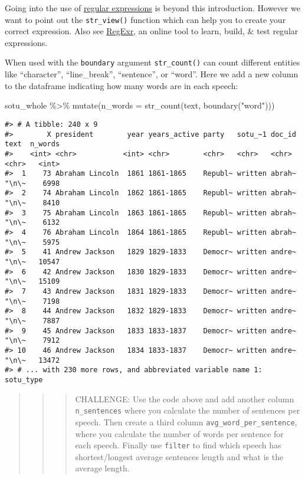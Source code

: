 \documentclass[
]{book}
\newenvironment{Shaded}{\begin{snugshade}}{\end{snugshade}}
\newcommand{\AttributeTok}[1]{\textcolor[rgb]{0.77,0.63,0.00}{#1}}
\newcommand{\FunctionTok}[1]{\textcolor[rgb]{0.00,0.00,0.00}{#1}}
\newcommand{\NormalTok}[1]{#1}
\newcommand{\SpecialCharTok}[1]{\textcolor[rgb]{0.00,0.00,0.00}{#1}}
\newcommand{\StringTok}[1]{\textcolor[rgb]{0.31,0.60,0.02}{#1}}
\begin{document}
Going into the use of \href{https://en.wikipedia.org/wiki/Regular_expression}{regular expressions} is beyond this introduction. However we want to point out the \texttt{str\_view()} function which can help you to create your correct expression. Also see \href{https://regexr.com/}{RegExr}, an online tool to learn, build, \& test regular expressions.

When used with the \texttt{boundary} argument \texttt{str\_count()} can count different entities like ``character'', ``line\_break'', ``sentence'', or ``word''. Here we add a new column to the dataframe indicating how many words are in each speech:

\begin{Shaded}
\begin{Highlighting}[]
\NormalTok{sotu\_whole }\SpecialCharTok{\%\textgreater{}\%} 
  \FunctionTok{mutate}\NormalTok{(}\AttributeTok{n\_words =} \FunctionTok{str\_count}\NormalTok{(text, }\FunctionTok{boundary}\NormalTok{(}\StringTok{"word"}\NormalTok{))) }
\end{Highlighting}
\end{Shaded}

\begin{verbatim}
#> # A tibble: 240 x 9
#>        X president        year years_active party   sotu_~1 doc_id text  n_words
#>    <int> <chr>           <int> <chr>        <chr>   <chr>   <chr>  <chr>   <int>
#>  1    73 Abraham Lincoln  1861 1861-1865    Republ~ written abrah~ "\n\~    6998
#>  2    74 Abraham Lincoln  1862 1861-1865    Republ~ written abrah~ "\n\~    8410
#>  3    75 Abraham Lincoln  1863 1861-1865    Republ~ written abrah~ "\n\~    6132
#>  4    76 Abraham Lincoln  1864 1861-1865    Republ~ written abrah~ "\n\~    5975
#>  5    41 Andrew Jackson   1829 1829-1833    Democr~ written andre~ "\n\~   10547
#>  6    42 Andrew Jackson   1830 1829-1833    Democr~ written andre~ "\n\~   15109
#>  7    43 Andrew Jackson   1831 1829-1833    Democr~ written andre~ "\n\~    7198
#>  8    44 Andrew Jackson   1832 1829-1833    Democr~ written andre~ "\n\~    7887
#>  9    45 Andrew Jackson   1833 1833-1837    Democr~ written andre~ "\n\~    7912
#> 10    46 Andrew Jackson   1834 1833-1837    Democr~ written andre~ "\n\~   13472
#> # ... with 230 more rows, and abbreviated variable name 1: sotu_type
\end{verbatim}

\begin{quote}
\begin{quote}
\begin{quote}
CHALLENGE: Use the code above and add another column \texttt{n\_sentences} where you calculate the number of sentences per speech. Then create a third column \texttt{avg\_word\_per\_sentence}, where you calculate the number of words per sentence for each speech. Finally use \texttt{filter} to find which speech has shortest/longest average sentences length and what is the average length.
\end{quote}
\end{quote}
\end{quote}
\end{document}

